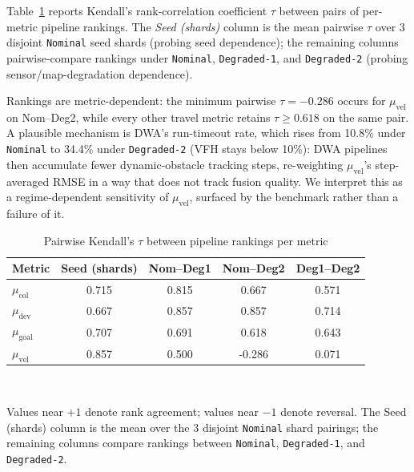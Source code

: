 \documentclass[conference]{IEEEtran}
\begin{document}
Table~\ref{tab:rq3} reports Kendall's rank-correlation coefficient $\tau$ between pairs of per-metric pipeline rankings. The \emph{Seed (shards)} column is the mean pairwise $\tau$ over 3 disjoint \texttt{Nominal} seed shards (probing seed dependence); the remaining columns pairwise-compare rankings under \texttt{Nominal}, \texttt{Degraded-1}, and \texttt{Degraded-2} (probing sensor/map-degradation dependence).
 
Rankings are metric-dependent: the minimum pairwise $\tau = -0.286$ occurs for $\mu_{\text{vel}}$ on Nom--Deg2, while every other travel metric retains $\tau \geq 0.618$ on the same pair. A plausible mechanism is DWA's run-timeout rate, which rises from 10.8\% under \texttt{Nominal} to 34.4\% under \texttt{Degraded-2} (VFH stays below 10\%): DWA pipelines then accumulate fewer dynamic-obstacle tracking steps, re-weighting $\mu_{\text{vel}}$'s step-averaged RMSE in a way that does not track fusion quality. We interpret this as a regime-dependent sensitivity of $\mu_{\text{vel}}$, surfaced by the benchmark rather than a failure of it.

\begin{table}[htbp]
    \caption{Pairwise Kendall's $\tau$ between pipeline rankings per metric}
    \label{tab:rq3}
    \begin{center}
        \begin{tabular}{|l|c|c|c|c|}
            \hline
            \textbf{Metric} & \textbf{Seed (shards)} & \textbf{Nom–Deg1} & \textbf{Nom–Deg2} & \textbf{Deg1–Deg2} \\
            \hline
 
            $\mu_{\text{col}}$   & 0.715 & 0.815 & 0.667 & 0.571 \\
            $\mu_{\text{dev}}$   & 0.667 & 0.857 & 0.857 & 0.714 \\
            $\mu_{\text{goal}}$  & 0.707 & 0.691 & 0.618 & 0.643 \\
            $\mu_{\text{vel}}$   & 0.857 & 0.500 & -0.286 & 0.071 \\
            \hline
        \end{tabular}
        \\[3pt]
        \raggedright
        \footnotesize
        Values near $+1$ denote rank agreement; values near $-1$ denote reversal. The Seed (shards) column is the mean over the 3 disjoint \texttt{Nominal} shard pairings; the remaining columns compare rankings between \texttt{Nominal}, \texttt{Degraded-1}, and \texttt{Degraded-2}.
    \end{center}
\end{table}
\end{document}

